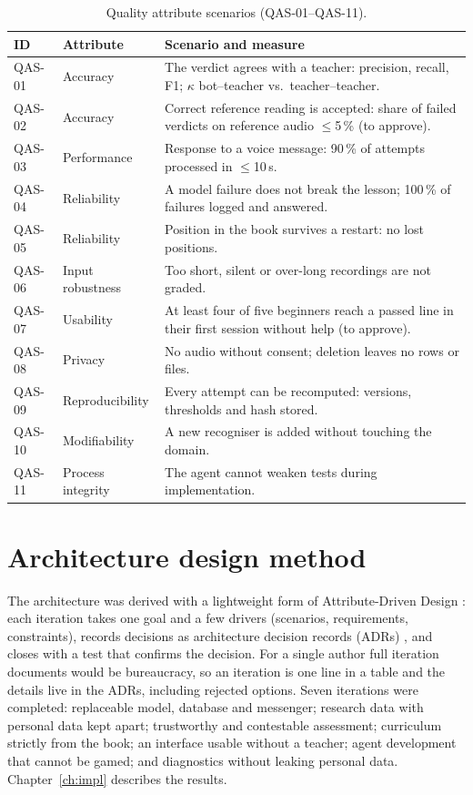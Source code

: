 \begin{table}[ht]
\centering\small
\caption{Quality attribute scenarios (QAS-01--QAS-11).}
\label{tab:qas}
\begin{tabularx}{\linewidth}{@{}lP{2.6cm}L@{}}
\toprule
ID & Attribute & Scenario and measure \\
\midrule
QAS-01 & Accuracy & The verdict agrees with a teacher: precision, recall, F1; $\kappa$ bot--teacher vs.\
teacher--teacher. \\
QAS-02 & Accuracy & Correct reference reading is accepted: share of failed verdicts on reference audio
$\le$5\,\% (to approve). \\
QAS-03 & Performance & Response to a voice message: 90\,\% of attempts processed in $\le$10\,s. \\
QAS-04 & Reliability & A model failure does not break the lesson; 100\,\% of failures logged and
answered. \\
QAS-05 & Reliability & Position in the book survives a restart: no lost positions. \\
QAS-06 & Input robustness & Too short, silent or over-long recordings are not graded. \\
QAS-07 & Usability & At least four of five beginners reach a passed line in their first session without
help (to approve). \\
QAS-08 & Privacy & No audio without consent; deletion leaves no rows or files. \\
QAS-09 & Reproducibility & Every attempt can be recomputed: versions, thresholds and hash stored. \\
QAS-10 & Modifiability & A new recogniser is added without touching the domain. \\
QAS-11 & Process integrity & The agent cannot weaken tests during implementation. \\
\bottomrule
\end{tabularx}
\end{table}

\section{Architecture design method}\label{sec:method-add}

The architecture was derived with a lightweight form of Attribute-Driven Design \cite{SRC-047}: each
iteration takes one goal and a few drivers (scenarios, requirements, constraints), records decisions as
architecture decision records (ADRs) \cite{SRC-010}, and closes with a test that confirms the decision.
For a single author full iteration documents would be bureaucracy, so an iteration is one line in a table
and the details live in the ADRs, including rejected options. Seven iterations were completed: replaceable
model, database and messenger; research data with personal data kept apart; trustworthy and contestable
assessment; curriculum strictly from the book; an interface usable without a teacher; agent development
that cannot be gamed; and diagnostics without leaking personal data. Chapter~\ref{ch:impl} describes the
results.

